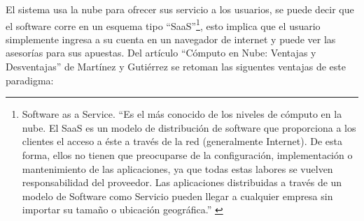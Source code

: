 El sistema usa la nube para ofrecer sus servicio a los usuarios, se puede decir que el software corre en un esquema tipo ``SaaS''\footnote{Software as a Service. ``Es el más conocido de los niveles de cómputo en la nube. El SaaS es un modelo de distribución de software que proporciona a los clientes el acceso a éste a través de la red (generalmente Internet). De esta forma, ellos no tienen que preocuparse de la configuración, implementación o mantenimiento de las aplicaciones, ya que todas estas labores se vuelven responsabilidad del proveedor. Las aplicaciones distribuidas a través de un modelo de Software como Servicio pueden llegar a cualquier empresa sin importar su tamaño o ubicación geográfica.'' \cite{computoNube}}, esto implica que el usuario simplemente ingresa a su cuenta en un navegador de internet y puede ver las asesorías para sus apuestas.  
Del artículo ``Cómputo en Nube: Ventajas y Desventajas'' de Martínez y Gutiérrez \cite{computoNube}  se retoman las siguentes ventajas de este paradigma:
